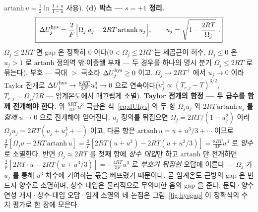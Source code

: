 $\mathrm{artanh}\,u=\tfrac12\ln\tfrac{1+u}{1-u}$ 사용). \textbf{(d) 박스 --- $s=+1$ 정리.}
\begin{equation}
\boxed{\;\Delta U_j^{\mathrm{hys}}
=\frac{2}{F}\Big[\Omega_j\,u_j-2RT\,\mathrm{artanh}\,u_j\Big],
\qquad u_j=\sqrt{1-\frac{2RT}{\Omega_j}}\;.}
\label{eq:dUhys}
\end{equation}
$\Omega_j\le2RT$ 면 gap 은
정확히 $0$ 이다($0<\Omega_j\le2RT$ 는 제곱근이 허수, $\Omega_j\le0$ 은 $u_j>1$ 로 $\mathrm{artanh}$ 정의역 밖$\cdot$이중웰 부재
--- 두 경우를 하나의 명시 분기 $\Omega_j\le2RT$ 로 묶는다). 부호 --- 극대 $>$ 극소라 $\Delta U_j^{\mathrm{hys}}\ge0$ 이고, $\Omega_j\to2RT^+$ 에서
$u_j\to0$ 이라 Taylor 전개로 $\Delta U_j^{\mathrm{hys}}\to\frac{8RT}{3F}u_j^3\to0$ 으로
연속이다($u_j^3\propto(T_{c,j}-T)^{3/2}$, $T_{c,j}=\Omega_j/2R$ --- 임계온도에서 매끄럽게 소멸). \textbf{Taylor 전개의 함정
--- 두 급수를 함께 전개해야 한다.} 위 $\frac{8RT}{3F}u^3$ 극한은 식~\eqref{eq:dUhys} 의 두 항 $\Omega_ju_j$ 와
$2RT\,\mathrm{artanh}\,u_j$ 를 \emph{함께} $u\to0$ 으로 전개해야 얻어진다. $u_j$ 정의를 뒤집으면
$\Omega_j=2RT/(1-u_j^2)$ 이라 $\Omega_ju_j=2RT(u_j+u_j^3+\cdots)$ 이고, 다른 항은 $\mathrm{artanh}\,u=u+u^3/3+\cdots$ 이므로
$\frac{2}{F}[\Omega_ju-2RT\,\mathrm{artanh}\,u]=\frac{2}{F}[2RT(u+u^3)-2RT(u+u^3/3)]=\frac{8RT}{3F}u^3$ 로 \emph{양수}로 소멸한다.
반면 $\Omega_j\approx2RT$ 를 첫째 항에 \emph{상수 대입}만 하고 $\mathrm{artanh}$ 만 전개하면
$\frac{2}{F}[2RT\cdot u-2RT(u+u^3/3)]=-\frac{4RT}{3F}u^3$ 로 \emph{부호가 뒤집힌} 오답에 이른다 --- $\Omega_j$ 가
$u_j$ 를 통해 $u^3$ 차수에 기여하는 몫을 빠뜨렸기 때문이다. 곧 임계온도 근방의 gap 은 반드시 양수로 소멸하며,
상수 대입은 물리적으로 무의미한 음의 gap 을 준다. 문턱·양수 연성 개시·상수-대입 오답·임계 소멸의 네 논점은
그림~\ref{fig:hysgap} 이 정확식의 수치 평가로 한 장에 모은다.

